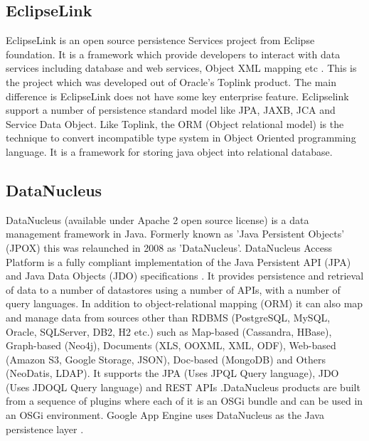      \pv

\subsection{EclipseLink}

     EclipseLink is an open source persistence Services project from Eclipse
     foundation. It is a framework which provide developers to
     interact with data services including database and web services,
     Object XML mapping etc \cite{www-eclipselink}. This is the project
     which was developed out of Oracle's Toplink product. The main
     difference is EclipseLink does not have some key enterprise
     feature. Eclipselink support a number of persistence standard
     model like JPA, JAXB, JCA and Service Data Object. Like Toplink,
     the ORM (Object relational model) is the technique to convert
     incompatible type system in Object Oriented programming
     language. It is a framework for storing java object into
     relational database.

     \pv
     
\subsection{DataNucleus}

     DataNucleus (available under Apache 2 open source license) is a
     data management framework in Java. Formerly known as 'Java
     Persistent Objects' (JPOX) this was relaunched in 2008 as
     'DataNucleus'. DataNucleus Access Platform is a fully
     compliant implementation
     of the Java Persistent API (JPA) and Java Data Objects (JDO)
     specifications  \cite{www-DataNucleusWiki}. It provides persistence
     and retrieval of data to
     a number of datastores using a number of APIs, with a number of
     query languages. In addition to object-relational mapping (ORM)
     it can also map and manage data from sources other than RDBMS
     (PostgreSQL, MySQL, Oracle, SQLServer, DB2, H2 etc.) such as
     Map-based (Cassandra, HBase), Graph-based (Neo4j), Documents
     (XLS, OOXML, XML, ODF), Web-based (Amazon S3, Google Storage,
     JSON), Doc-based (MongoDB) and Others (NeoDatis, LDAP). It
     supports the JPA (Uses JPQL Query language), JDO (Uses JDOQL
     Query language) and REST APIs \cite{www-DataNucleus}.DataNucleus
     products are built from a sequence of plugins where each of it is
     an OSGi bundle and can be used in an OSGi environment. Google App
     Engine uses DataNucleus as the Java persistence layer
     \cite{www-DataNucleusPerformance}.

